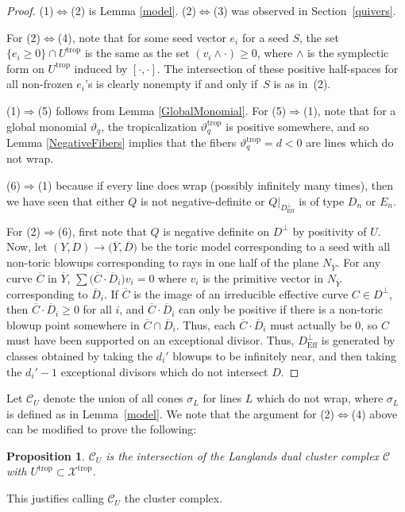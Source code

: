 \documentclass[11pt]{article}
\numberwithin{equation}{section}
\numberwithin{figure}{section}
\numberwithin{table}{section}
\DeclareMathOperator{\trop}{trop}
\DeclareMathOperator{\Eff}{Eff}
\let\?=\overline
\let\rar=\rightarrow
\let\s=\mathcal
\newtheorem{prop}[thm]{Proposition}
\theoremstyle{definition}
\begin{document}
\begin{proof}(1)$\Leftrightarrow$(2) is Lemma \ref{model}. (2)$\Leftrightarrow$(3) was observed in Section~\ref{quivers}.

For (2)$\Leftrightarrow$(4), note that for some seed vector $e_i$ for a seed $S$, the set $\{e_i\geq 0\}\cap U^{\trop}$ is the same as the set $(v_i\wedge \cdot) \geq 0$, where $\wedge$ is the symplectic form on $U^{\trop}$ induced by $[ \cdot,\cdot]$. The intersection of these positive half-spaces for all non-frozen $e_i$'s is clearly nonempty if and only if~$S$ is as in~(2).

 (1)$\Rightarrow$(5) follows from Lemma \ref{GlobalMonomial}. For (5)$\Rightarrow$(1), note that for a global monomial $\vartheta_q$, the tropicalization $\vartheta_q^{\trop}$ is positive somewhere, and so Lemma \ref{NegativeFibers} implies that the fibers $\vartheta_q^{\trop}=d<0$ are lines which do not wrap.

 (6)$\Rightarrow$(1) because if every line does wrap (possibly infinitely many times), then we have seen that either $Q$ is not negative-definite or $Q|_{D^{\perp}_{\Eff}}$ is of type $D_n$ or $E_n$.

 For (2)$\Rightarrow$(6), first note that $Q$ is negative definite on $D^{\perp}$ by positivity of $U$. Now, let $(Y,D)\rar \big(\?{Y},\?{D}\big)$ be the toric model corresponding to a seed with all non-toric blowups corresponding to rays in one half of the plane $N_{\?{Y}}$. For any curve $\?{C}$ in $\?{Y}$, $\sum \big(\?{C}\cdot \?{D}_i\big) v_i=0$ where $v_i$ is the primitive vector in $N_{\?{Y}}$ corresponding to $\?{D}_i$. If $\?{C}$ is the image of an irreducible effective curve $C\in D^{\perp}$, then $\?{C}\cdot \?{D}_i \geq 0$ for all $i$, and $\?{C}\cdot \?{D}_i$ can only be positive if there is a non-toric blowup point somewhere in $\?{C} \cap \?{D}_i$. Thus, each $\?{C}\cdot \?{D}_i$ must actually be $0$, so $C$ must have been supported on an exceptional divisor. Thus, $D^{\perp}_{\Eff}$ is generated by classes obtained by taking the $d_i'$ blowups to be infinitely near, and then taking the $d_i'-1$ exceptional divisors which do not intersect $D$.
\end{proof}

Let $\s{C}_U$ denote the union of all cones $\sigma_L$ for lines $L$ which do not wrap, where $\sigma_L$ is defined as in Lemma~\ref{model}. We note that the argument for (2)$\Leftrightarrow$(4) above can be modified to prove the following:
\begin{prop} $\s{C}_U$ is the intersection of the Langlands dual cluster complex $\s{C}$ with $U^{\trop}\subset \s{X}^{\trop}$.
\end{prop}
This justifies \cite{Man1} calling $\s{C}_U$ the cluster complex.
\end{document}
